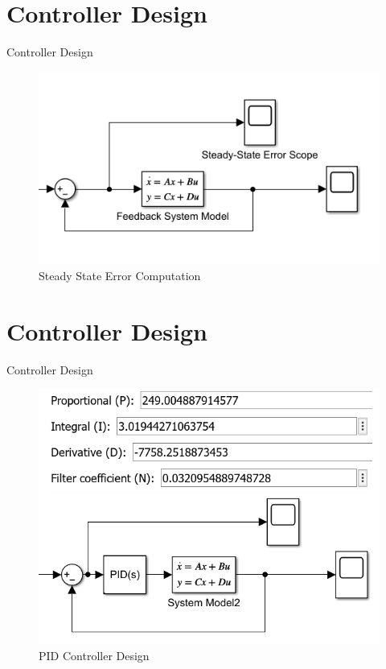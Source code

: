 \documentclass[10pt,compress,mathserif]{beamer}
\begin{document}
\section{Controller Design}
\begin{frame}{Controller Design}
	\begin{figure}[h!]
		\centering
		\includegraphics[scale=0.75]{images/SSE_Sketch.png}
		\caption{Steady State Error Computation}
	\end{figure}
\end{frame}

\section{Controller Design}
\begin{frame}{Controller Design}
		
	\begin{figure}[h!]
		\centering
		\includegraphics[scale=0.65]{images/PIDController.png}
		\caption{PID Controller Design}
	\end{figure}

\end{frame}
\end{document}
